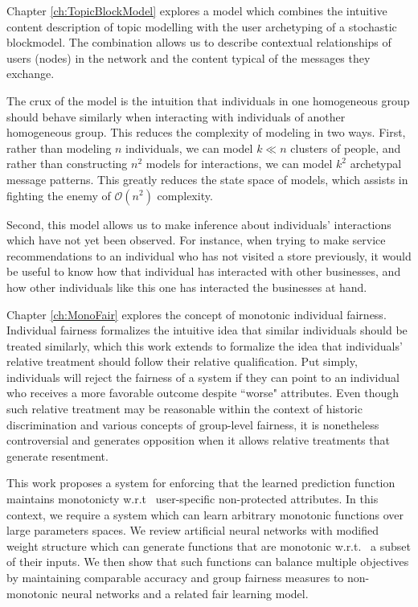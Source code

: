 Chapter \ref{ch:TopicBlockModel} explores a model which combines the intuitive content description of topic modelling with the user archetyping of a stochastic blockmodel.  The combination allows us to describe contextual relationships of users (nodes) in the network and the content typical of the messages they exchange.

The crux of the model is the intuition that individuals in one homogeneous group should behave similarly when interacting with individuals of another homogeneous group.  This reduces the complexity of modeling in two ways.  First, rather than modeling $n$ individuals, we can model $k \ll n$ clusters of people, and rather than constructing $n^2$ models for interactions, we can model $k^2$ archetypal message patterns.  This greatly reduces the state space of models, which assists in fighting the enemy of $\mathcal{O}(n^2)$ complexity.  

Second, this model allows us to make inference about individuals' interactions which have not yet been observed.  For instance, when trying to make service recommendations to an individual who has not visited a store previously, it would be useful to know how that individual has interacted with other businesses, and how other individuals like this one has interacted the businesses at hand.



Chapter \ref{ch:MonoFair} explores the concept of monotonic individual fairness.  Individual fairness \citep{dwork2012fairness} formalizes the intuitive idea that similar individuals should be treated similarly, which this work extends to formalize the idea that individuals' relative treatment should follow their relative qualification.  Put simply, individuals will reject the fairness of a system if they can point to an individual who receives a more favorable outcome despite ``worse" attributes.  Even though such relative treatment may be reasonable within the context of historic discrimination and various concepts of group-level fairness, it is nonetheless controversial and generates opposition when it allows relative treatments that generate resentment.

This work proposes a system for enforcing that the learned prediction function maintains monotonicty w.r.t~ user-specific non-protected attributes.  In this context, we require a system which can learn arbitrary monotonic functions over large parameters spaces.  We review artificial neural networks with modified weight structure which can generate functions that are monotonic w.r.t.~ a subset of their inputs. We then show that such functions can balance multiple objectives by maintaining comparable accuracy and group fairness measures to non-monotonic neural networks and a related fair learning model.



